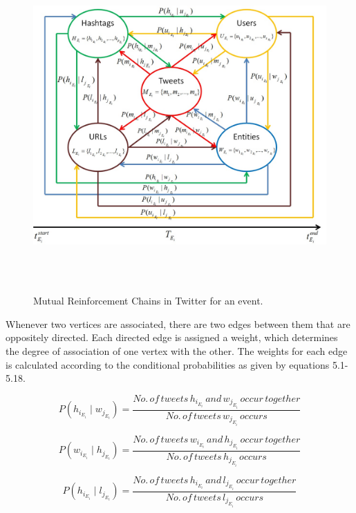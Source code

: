 \begin{figure}[htbp]
\centering
\caption{\small Mutual Reinforcement Chains in Twitter for an event.}    
\includegraphics[width=16cm,height=12cm]{Figures/TwitterEventInfoGraph.jpg}
\label{mrc}
\end{figure}
 

Whenever two vertices are associated, there are two edges between them that are oppositely directed. Each directed edge is assigned a weight, which determines the degree of association of one vertex with the other. The weights for each edge is calculated according to the conditional probabilities as given by equations 5.1-5.18. 

\begin{equation}
P(h_{i_{E_{i}}} \mid w_{j_{E_{i}}}) = \frac{No. \, of \, tweets \, h_{i_{E_{i}}} \, and \, w_{j_{E_{i}}} \, occur \, together}{No. \, of \, tweets \, w_{j_{E_{i}}} \, occurs}
\end{equation}

\begin{equation}
P(w_{i_{E_{i}}} \mid h_{j_{E_{i}}}) = \frac{No. \, of \, tweets \, w_{i_{E_{i}}} \, and \, h_{j_{E_{i}}} \, occur \, together}{No. \, of \, tweets \, h_{j_{E_{i}}} \, occurs}
\end{equation}

\begin{equation}
P(h_{i_{E_{i}}} \mid l_{j_{E_{i}}}) = \frac{No. \, of \, tweets \, h_{i_{E_{i}}} \, and \, l_{j_{E_{i}}} \, occur \, together}{No. \, of \, tweets \, l_{j_{E_{i}}} \, occurs}
\end{equation}

